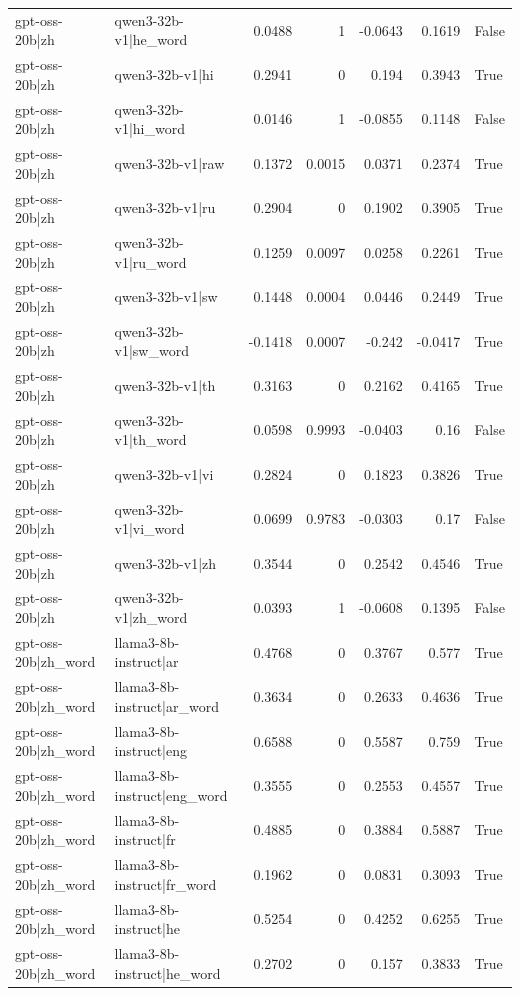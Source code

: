 \begin{table}
\begin{tabular}{l l r r r r l}
gpt-oss-20b|zh & qwen3-32b-v1|he_word & 0.0488 & 1 & -0.0643 & 0.1619 & False \\
gpt-oss-20b|zh & qwen3-32b-v1|hi & 0.2941 & 0 & 0.194 & 0.3943 & True \\
gpt-oss-20b|zh & qwen3-32b-v1|hi_word & 0.0146 & 1 & -0.0855 & 0.1148 & False \\
gpt-oss-20b|zh & qwen3-32b-v1|raw & 0.1372 & 0.0015 & 0.0371 & 0.2374 & True \\
gpt-oss-20b|zh & qwen3-32b-v1|ru & 0.2904 & 0 & 0.1902 & 0.3905 & True \\
gpt-oss-20b|zh & qwen3-32b-v1|ru_word & 0.1259 & 0.0097 & 0.0258 & 0.2261 & True \\
gpt-oss-20b|zh & qwen3-32b-v1|sw & 0.1448 & 0.0004 & 0.0446 & 0.2449 & True \\
gpt-oss-20b|zh & qwen3-32b-v1|sw_word & -0.1418 & 0.0007 & -0.242 & -0.0417 & True \\
gpt-oss-20b|zh & qwen3-32b-v1|th & 0.3163 & 0 & 0.2162 & 0.4165 & True \\
gpt-oss-20b|zh & qwen3-32b-v1|th_word & 0.0598 & 0.9993 & -0.0403 & 0.16 & False \\
gpt-oss-20b|zh & qwen3-32b-v1|vi & 0.2824 & 0 & 0.1823 & 0.3826 & True \\
gpt-oss-20b|zh & qwen3-32b-v1|vi_word & 0.0699 & 0.9783 & -0.0303 & 0.17 & False \\
gpt-oss-20b|zh & qwen3-32b-v1|zh & 0.3544 & 0 & 0.2542 & 0.4546 & True \\
gpt-oss-20b|zh & qwen3-32b-v1|zh_word & 0.0393 & 1 & -0.0608 & 0.1395 & False \\
gpt-oss-20b|zh_word & llama3-8b-instruct|ar & 0.4768 & 0 & 0.3767 & 0.577 & True \\
gpt-oss-20b|zh_word & llama3-8b-instruct|ar_word & 0.3634 & 0 & 0.2633 & 0.4636 & True \\
gpt-oss-20b|zh_word & llama3-8b-instruct|eng & 0.6588 & 0 & 0.5587 & 0.759 & True \\
gpt-oss-20b|zh_word & llama3-8b-instruct|eng_word & 0.3555 & 0 & 0.2553 & 0.4557 & True \\
gpt-oss-20b|zh_word & llama3-8b-instruct|fr & 0.4885 & 0 & 0.3884 & 0.5887 & True \\
gpt-oss-20b|zh_word & llama3-8b-instruct|fr_word & 0.1962 & 0 & 0.0831 & 0.3093 & True \\
gpt-oss-20b|zh_word & llama3-8b-instruct|he & 0.5254 & 0 & 0.4252 & 0.6255 & True \\
gpt-oss-20b|zh_word & llama3-8b-instruct|he_word & 0.2702 & 0 & 0.157 & 0.3833 & True \\

\end{tabular}
\end{table}
